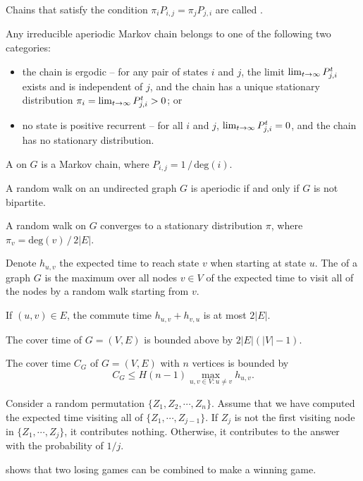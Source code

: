 \documentclass[main.tex]{subfiles}
\begin{document}
Chains that satisfy the condition $\pi_iP_{i,j}=\pi_jP_{j,i}$ are called .

\begin{theorem}
    Any irreducible aperiodic Markov chain belongs to one of the following two categories:
    \begin{itemize}
        \item the chain is ergodic -- for any pair of states $i$ and $j$, the limit $\lim_{t\rightarrow\infty}P^t_{j,i}$ exists and is independent of $j$, and the chain has a unique stationary distribution $\pi_i=\lim_{t\rightarrow\infty}P^t_{j,i}>0$; or 
        \item no state is positive recurrent -- for all $i$ and $j$, $\lim_{t\rightarrow\infty}P^t_{j,i}=0$, and the chain has no stationary distribution.
    \end{itemize}
\end{theorem}

A  on $G$ is a Markov chain, where $P_{i,j}=1\,/\,\mathrm{deg}(i)$.

\begin{lemma}
    A random walk on an undirected graph $G$ is aperiodic if and only if $G$ is not bipartite.
\end{lemma}

\begin{theorem}
    A random walk on $G$ converges to a stationary distribution $\pi$, where $\pi_v=\mathrm{deg}(v)\,/\,2 |E|$.
\end{theorem}

Denote  $h_{u,v}$ the expected time to reach state $v$ when starting at state $u$. The  of a graph $G$ is the maximum over all nodes $v\in V$ of the expected time to visit all of the nodes by a random walk starting from $v$.

\begin{lemma}
    If $(u,v)\in E$, the commute time $h_{u,v}+h_{v,u}$ is at most $2 |E|$.
\end{lemma}

\begin{lemma}
    The cover time of $G=(V,E)$ is bounded above by $2|E|(|V|-1)$.
\end{lemma}

\begin{theorem}
    The cover time $C_G$ of $G=(V,E)$ with $n$ vertices is bounded by
    \[C_G\le H(n-1)\max_{u,v\in V: u\not=v}h_{u,v}.\]
\end{theorem}

\begin{pf}
    Consider a random permutation $\{Z_1,Z_2,\cdots,Z_n\}$. Assume that we have computed the expected time visiting all of $\{Z_1,\cdots, Z_{j-1}\}$. If $Z_j$ is not the first visiting node in $\{Z_1,\cdots, Z_j\}$, it contributes nothing. Otherwise, it contributes to the answer with the probability of $1/j$.
\end{pf}

 shows that two losing games can be combined to make a winning game.
\end{document}
